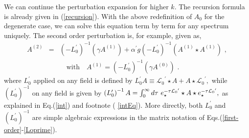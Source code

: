 \documentclass[a4paper,aps,preprint,nofootinbib,eqsecnum]{revtex4}
\newcommand{\cL}{{\mathcal{L}_0}}
\begin{document}
We can continue the perturbation expansion for higher $k$. The recursion
formula is already given in (\ref{recursion}).
With the above redefinition of $A_{0}$ for the degenerate case, we can solve
this equation term by term for any spectrum uniquely. The second order
perturbation is, for example, given as, %
\begin{eqnarray}
A^{\left( 2\right) } &=&(-L_{0}^{\prime })^{-1}\left( \gamma A^{\left(
1\right) }\right) +{\alpha ^{\prime }}g(-L_{0}^{\prime })^{-1}(A^{\left(
1\right) }\star A^{\left( 1\right) })\,\,, \\
&&\quad \mbox{with}\quad A^{\left( 1\right) }=(-L_{0}^{\prime })^{-1}\left(
\gamma A^{\left( 0\right) }\right) \,\,.
\end{eqnarray}%
where $L_{0}^{\prime }$ applied on any field is defined by $L_{0}^{\prime
}A\equiv {\mathcal{L}_{0}}^{\prime }\star A+A\star {\mathcal{L}_{0}}^{\prime
},$ while $\left( L_{0}^{\prime }\right) ^{-1}$ on any field is given by $%
\left( L_{0}^{\prime }\right) ^{-1}A=\int_{0}^{\infty }d\tau ~e_{\star
}^{-\tau {\mathcal{L}_{0}}^{\prime }}\star A\star e_{\star }^{-\tau {%
\mathcal{L}_{0}}^{\prime }},$ as explained in Eq.(\ref{int}) and footnote (%
\ref{intEq}). More directly, both $L_{0}^{\prime }$ and $\left(
L_{0}^{\prime }\right) ^{-1}$ are simple algebraic expressions in the matrix
notation of Eqs.(\ref{first-order}-\ref{Loprime}).
\end{document}
